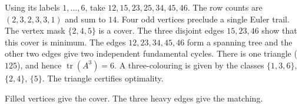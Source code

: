 \par\noindent\begin{minipage}{\linewidth}\begin{example}\leavevmode\label{ex:six}
Using its labels $1,\ldots,6$, take $12,15,23,25,34,45,46$. The row counts
are $(2,3,2,3,3,1)$ and sum to $14$. Four odd vertices preclude a single
Euler trail. The vertex mask $\{2,4,5\}$ is a cover. The three disjoint edges
$15,23,46$ show that this cover is minimum. The edges
$12,23,34,45,46$ form a spanning tree and the other two edges give two
independent fundamental cycles. There is one triangle ($125$), and hence
$\operatorname{tr}(A^3)=6$. A three-colouring is given by the classes
$\{1,3,6\}$, $\{2,4\}$, $\{5\}$. The triangle certifies optimality.

\begin{center}
\par
{\small Filled vertices give the cover. The three heavy edges give the matching.}
\end{center}
\end{example}\end{minipage}\par

